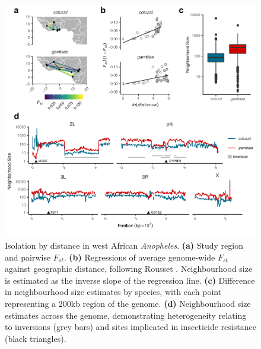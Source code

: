 \documentclass[a4paper,11pt,abstracton,hidelinks]{scrartcl}
\begin{document}
\begin{figure}[H]
	\begin{center}
		\includegraphics*[width=6.3in]{artwork/west_africa_multipanel_edit.pdf}
	\end{center}
	\caption{Isolation by distance in west African \textit{Anopheles}. \textbf{(a)} Study region and pairwise $F_{st}$. \textbf{(b)} Regressions of average genome-wide $F_{st}$ against geographic distance, following Rousset \cite{rousset1997genetic}. Neighbourhood size is estimated as the inverse slope of the regression line. \textbf{(c)} Difference in neighbourhood size estimates by species, with each point representing a 200kb region of the genome. \textbf{(d)} Neighbourhood size estimates across the genome, demonstrating heterogeneity relating to inversions (grey bars) and sites implicated in insecticide resistance (black triangles).}
	\label{fig:ibd_fig}
\end{figure}
\end{document}
